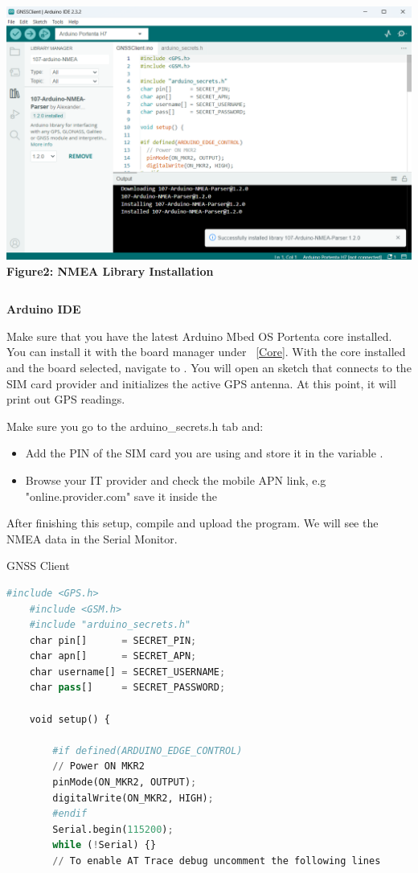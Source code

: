 {\begin{columns}
		\centering
		\includegraphics[width=\textwidth]{images/NMEALibraryInstall.png}
		\vspace{0.2cm}
		\textbf{Figure2: NMEA Library Installation} 
		\label{NMEA}
	\end{columns}

\textbf{Arduino IDE}

Make sure that you have the latest Arduino Mbed OS Portenta core installed. You can install it with the board manager under  ~\ref{Core}. With the core installed and the board selected, navigate to . You will open an sketch that connects to the SIM card provider and initializes the active GPS antenna. At this point, it will print out GPS readings.

Make sure you go to the arduino\_secrets.h tab and:

\begin{itemize}
	\item Add the PIN of the SIM card you are using and store it in the variable .
	\item Browse your IT provider and check the mobile APN link, e.g "online.provider.com" save it inside the 
\end{itemize} 

After finishing this setup, compile and upload the program. We will see the NMEA data in the Serial Monitor.
}

\begin{frame}[fragile]{GNSS Client}
	
	\begin{lstlisting}[language=Python]
	#include <GPS.h>
	#include <GSM.h>
	#include "arduino_secrets.h"
	char pin[]      = SECRET_PIN;
	char apn[]      = SECRET_APN;
	char username[] = SECRET_USERNAME;
	char pass[]     = SECRET_PASSWORD;
		
	void setup() {
		
		#if defined(ARDUINO_EDGE_CONTROL)
		// Power ON MKR2
		pinMode(ON_MKR2, OUTPUT);
		digitalWrite(ON_MKR2, HIGH);
		#endif
		Serial.begin(115200);
		while (!Serial) {}
		// To enable AT Trace debug uncomment the following lines
		\end{lstlisting}
\end{frame}

